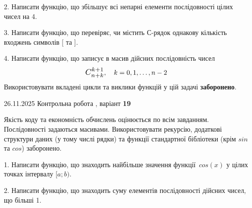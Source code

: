 \documentclass[11pt, ukrainian]{article}
\begin{document}
{{{{{{{{{{{{{{{{{{\begin {large}
\vspace{2mm}


2. Написати функцію, що збільшує всі непарні елементи послідовності цілих чисел на 4.

\vspace{2mm}


3. Написати функцію, що перевіряє, чи містить С-рядок однакову кількість входжень символів [ та ].

\vspace{2mm}


4. 
Написати функцію, що записує в масив дійсних послідовність чисел
$$\scalebox{1.2}{$C_{n+k}^{k+1}$}, \quad k=0,1,\ldots,n-2$$
\quad Використовувати вкладені цикли та виклики функцій у цій задачі \textbf{заборонено}.

\vspace{2mm}

\end{large}
\newpage
{{26.11.2025 Контрольна робота , варіант  \No \textbf { 19 }\par}}


{
Якість коду та економність обчислень оцінюється по всім завданням. Послідовності задаються масивами. Використовувати рекурсію, додаткові структури даних (у тому числі рядки) та функції стандартної бібліотеки (крім $sin$ та $cos$) заборонено.

\vspace{2mm}

\begin {large}
1. Написати функцію, що знаходить найбільше значення функції~$cos(x)$ у цілих точках інтервалу $[a; b)$.

\vspace{2mm}


2. Написати функцію, що знаходить суму елементів послідовності дійсних чисел, що більші 1.

\vspace{2mm}


\end{large}}}}}}}}}}}}}}}}}}}}
\end{document}
